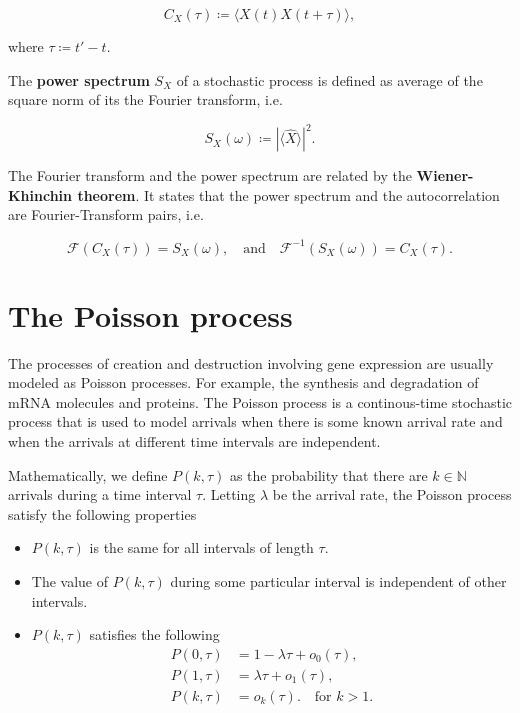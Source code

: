 \begin{equation*}
  C_X(\tau) \coloneqq \langle X(t)X(t+\tau)\rangle,
\end{equation*}

where $\tau \coloneqq t'-t$.

The \textbf{power spectrum} $S_X$ of a stochastic process is defined as average of the square norm of its the Fourier transform, i.e.

\begin{equation*}
  S_X(\omega) \coloneqq \left|\langle\hat X\rangle\right|^2.
\end{equation*}

The Fourier transform and the power spectrum are related by the \textbf{Wiener-Khinchin theorem}. It states that the power spectrum and the autocorrelation are Fourier-Transform pairs, i.e.

\begin{equation}
  \label{eq:con-wkth}
  \mathscr{F}(C_X(\tau)) = S_X(\omega),\quad\text{and}\quad \mathscr{F}^{-1}(S_X(\omega)) = C_X(\tau).
\end{equation}

\section{The Poisson process}
\label{sec:poisson}

The processes of creation and destruction involving gene expression are usually modeled as Poisson processes. For example, the synthesis and degradation of mRNA molecules and proteins. The Poisson process is a continous-time stochastic process that is used to model arrivals when there is some known arrival rate and when the arrivals at different time intervals are independent.

Mathematically, we define $P(k,\tau)$ as the probability that there are $k\in\mathbb{N}$ arrivals during a time interval $\tau$. Letting $\lambda$ be the arrival rate, the Poisson process satisfy the following properties

\begin{itemize}
  \item  $P(k,\tau)$ is the same for all intervals of length $\tau$.
  \item  The value of $P(k,\tau)$ during some particular interval is independent of other intervals.
  \item $P(k,\tau)$ satisfies the following
    \begin{equation*}
      \begin{split}
        P(0,\tau)&=1-\lambda\tau+o_0(\tau),\\
        P(1,\tau)&=\lambda\tau+o_1(\tau),\\
        P(k,\tau)&=o_k(\tau).\quad\text{for } k>1.
      \end{split}
    \end{equation*}
\end{itemize}
    

